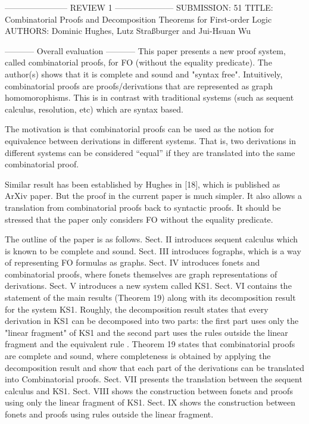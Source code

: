 ----------------------- REVIEW 1 ---------------------
SUBMISSION: 51
TITLE: Combinatorial Proofs and Decomposition Theorems for First-order Logic
AUTHORS: Dominic Hughes, Lutz Straßburger and Jui-Hsuan Wu

----------- Overall evaluation -----------
This paper presents a new proof system, called combinatorial proofs, for FO (without the equality predicate).
The author(s) shows that it is complete and sound and "syntax free".
Intuitively, combinatorial proofs are proofs/derivations that are represented as graph homomorophisms.
This is in contrast with traditional systems (such as sequent calculus, resolution, etc)
which are syntax based.

The motivation is that combinatorial proofs can be used as the notion for equivalence between derivations in different systems.
That is, two derivations in different systems can be considered ``equal'' if they are translated into the same combinatorial proof.

Similar result has been established by Hughes in [18], which is published as ArXiv paper.
But the proof in the current paper is much simpler.
It also allows a translation from combinatorial proofs back to syntactic proofs.
It should be stressed that the paper only considers FO without the equality predicate.

The outline of the paper is as follows.
Sect. II introduces sequent calculus which is known to be complete and sound.
Sect. III introduces fographs, which is a way of representing FO formulas as graphs.
Sect. IV introduces fonets and combinatorial proofs, where fonets themselves are graph representations of derivations.
Sect. V introduces a new system called KS1.
Sect. VI contains the statement of the main results (Theorem 19) along with its decomposition result for the system KS1.
Roughly, the decomposition result states that every derivation in KS1 can be decomposed into two parts:
the first part uses only the "linear fragment" of KS1 and the second part uses the rules outside the linear fragment and the equivalent rule \equiv.
Theorem 19 states that combinatorial proofs are complete and sound,
where completeness is obtained by applying the decomposition result and show that each part of the derivations can be translated into Combinatorial proofs.
Sect. VII presents the translation between the sequent calculus and KS1.
Sect. VIII shows the construction between fonets and proofs using only the linear fragment of KS1.
Sect. IX shows the construction between fonets and proofs using rules outside the linear fragment.

